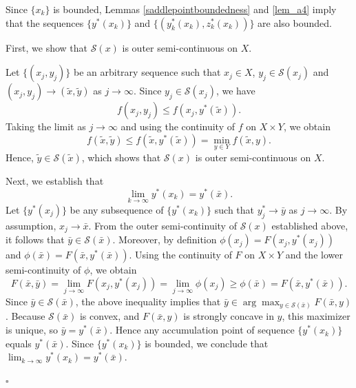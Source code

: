 \documentclass{article}
\newenvironment{proof}[1][Proof]{\par
	\normalfont\topsep6pt\relax
	\trivlist\item[\hskip\labelsep\itshape #1.]\ignorespaces
}{%
	\hfill\ensuremath{\square}\endtrivlist
}
\begin{document}
\begin{proof}[Proof for Theorem \ref{lim_yz}]
Since $\{x_k\}$ is bounded, Lemmas \ref{saddlepointboundedness} and \ref{lem_a4} imply that the sequences $\{y^*(x_k)\}$ and $\{(y_k^*(x_k),z_k^*(x_k))\}$ are also bounded.

First, we show that $\mathcal{S}(x)$ is outer semi-continuous on $X$. 

Let $\{(x_j, y_j)\}$ be an arbitrary sequence such that $x_j \in X$, $y_j \in \mathcal{S}(x_j)$ and $(x_j, y_j) \rightarrow (\tilde{x}, \tilde{y})$ as $j \rightarrow \infty$. Since $y_j \in \mathcal{S}(x_j)$, we have
\[
f(x_j,y_j) \le f(x_j,y^*(\tilde{x})).
\]
Taking the limit as $j \to \infty$ and using the continuity of $f$ on $X \times Y$, we obtain
\[
f(\tilde{x}, \tilde{y}) \le f(\tilde{x},y^*(\tilde{x})) = \min_{y \in Y} f(\tilde{x}, y).
\]
Hence, $\tilde{y} \in \mathcal{S}(\tilde{x})$, which shows that $\mathcal{S}(x)$ is outer semi-continuous on $X$.

Next, we establish that
\[
\lim_{k \to\infty}y^*(x_k)=y^*(\bar{x}).
\]    
Let $\{y^*(x_j)\}$ be any subsequence of $\{y^*(x_k)\}$ such that $y_j^* \rightarrow \bar{y}$ as $j \rightarrow \infty$. By assumption, $x_j \rightarrow \bar{x}$. From the outer semi-continuity of $\mathcal{S}(x)$ established above, it follows that $\bar{y} \in \mathcal{S}(\bar{x})$. Moreover, by definition $\phi(x_j) = F(x_j,y^*(x_j))$ and $\phi(\bar{x}) = F(\bar{x}, y^*(\bar{x}))$. Using the continuity of $F$ on $X \times Y$ and the lower semi-continuity of $\phi$, we obtain
\[
F(\bar{x},\bar{y})=\lim_{j\to\infty}F(x_{j},y^*(x_j))=\lim_{j\to\infty} \phi(x_{j})\ge \phi(\bar{x}) =F(\bar{x},y^*(\bar{x})).
\]
Since $\bar{y} \in \mathcal{S}(\bar{x})$, the above inequality implies that $\bar{y} \in \arg\max_{y\in\mathcal{S}(\bar{x})}F(\bar{x},y) $. Because $\mathcal{S}(\bar{x})$ is convex, and $F(\bar{x},y)$ is strongly concave in $y$, this maximizer is unique, so $\bar{y} = y^*(\bar{x})$. Hence any accumulation point of sequence $\{y^*(x_k)\}$ equals $y^*(\bar{x})$. Since $\{y^*(x_k)\}$ is bounded, we conclude that $\lim_{k \to\infty}y^*(x_k)=y^*(\bar{x})$.


\end{proof}
\end{document}
